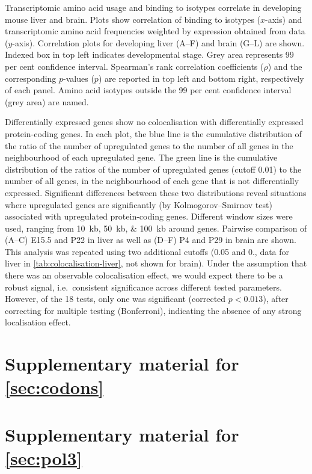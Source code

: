\thispagestyle{empty}
    {Transcriptomic \mrna amino acid usage and  binding to \trna isotypes
    correlate in developing mouse liver and brain.}
    {Plots show correlation of  binding to \trna isotypes (\(x\)-axis) and
    transcriptomic amino acid frequencies weighted by expression obtained from
    \rnaseq data (\(y\)-axis). Correlation plots for developing liver (A–F) and
    brain (G–L) are shown. Indexed box in top left indicates developmental
    stage. Grey area represents \num{99} per cent confidence interval.
    Spearman’s rank correlation coefficients (\(\rho\)) and the corresponding
    \(p\)-values (\(p\)) are reported in top left and bottom right, respectively
    of each panel. Amino acid isotypes outside the \num{99} per cent confidence
    interval (grey area) are named.}

    {Differentially expressed \trna genes show no colocalisation with
    differentially expressed protein-coding genes.}
    {In each plot, the blue line is the cumulative distribution of the ratio of
    the number of upregulated \mrna genes to the number of all \mrna genes in
    the neighbourhood of each upregulated \trna gene. The green line is the
    cumulative distribution of the ratios of the number of upregulated \mrna
    genes (\fdr cutoff \num{0.01}) to the number of all \mrna genes, in the
    neighbourhood of each \trna gene that is not differentially expressed.
    Significant differences between these two distributions reveal situations
    where upregulated \trna genes are significantly (by Kolmogorov–Smirnov test)
    associated with upregulated protein-coding genes. Different window sizes
    were used, ranging from \SIlist{10;50;100}{kb} around \trna genes. Pairwise
    comparison of (A–C) E15.5 and P22 in liver as well as (D–F) P4 and P29 in
    brain are shown. This analysis was repeated using two additional \fdr
    cutoffs (\num{0.05} and \num{0.}, data for liver in
    \cref{tab:colocalisation-liver}, not shown for brain). Under the assumption
    that there was an observable colocalisation effect, we would expect there to
    be a robust signal, i.e.\ consistent significance across different tested
    parameters. However, of the \num{18} tests, only one was significant
    (corrected \(p<0.013\)), after correcting for multiple testing (Bonferroni),
    indicating the absence of any strong localisation effect.}

\chapter{Supplementary material for \texorpdfstring{\cref*{sec:codons}}{chapter 3}}

\chapter{Supplementary material for \texorpdfstring{\cref*{sec:pol3}}{chapter 4}}

\endgroup
